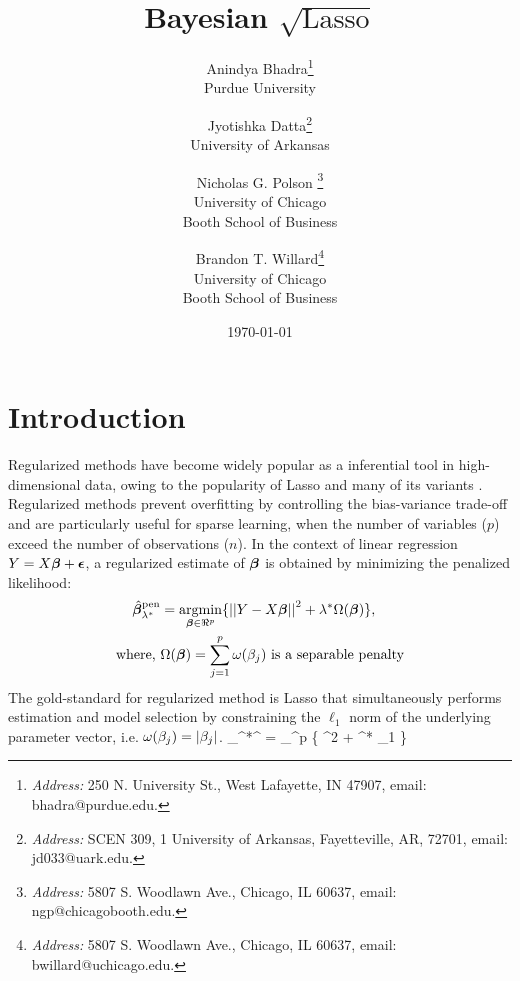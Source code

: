 \documentclass[12pt]{article}
\title{Bayesian $\sqrt{\text{Lasso}}$}
\author{
  Anindya Bhadra\footnote{
  {\em Address:} 250 N. University St., West Lafayette, IN 47907, 
  email: bhadra@purdue.edu.} \\
  Purdue University
  \and Jyotishka Datta\footnote{
  {\em Address:} SCEN 309, 1 University of Arkansas, Fayetteville, AR, 72701, 
  email: jd033@uark.edu.}\\ 
  University of Arkansas \\
  \and Nicholas G. Polson \footnote{
  {\em Address:} 5807 S. Woodlawn Ave., Chicago, IL 60637, 
  email: ngp@chicagobooth.edu.}  \\
  University of Chicago  \\
  Booth School of Business
  \and 
  Brandon T. Willard\footnote{
  {\em Address:} 5807 S. Woodlawn Ave., Chicago, IL 60637, 
  email: bwillard@uchicago.edu.} \\
  University of Chicago  \\
  Booth School of Business
}
\date{\today}
\begin{document}
\maketitle
\onehalfspacing



\section{Introduction}

Regularized methods have become widely popular as a inferential tool in high-dimensional data, owing to the popularity of Lasso \citep{tibshirani96} and many of its variants \citep{tibshirani2014praise}. Regularized methods prevent overfitting by controlling the bias-variance trade-off and are particularly useful for sparse learning, when the number of variables ($p$) exceed the number of observations ($n$). In the context of linear regression $Y = X \boldsymbol{\beta} + \boldsymbol{\epsilon}$, a regularized estimate of $\boldsymbol{\beta}$ is obtained by minimizing the penalized likelihood:
\begin{align}
\hat{\bbeta}_{\lambda^*}^{\text{pen}} & = \argmin_{\bbeta \in \Re^p} \{ \vectornorm{Y - X\bbeta}^2 + \lambda^* \Omega(\bbeta) \}, \label{eq:penalize} \\
  \text{where, } & \Omega(\bbeta) = \sum_{j=1}^{p} \omega(\beta_j) \text{ is a separable penalty}
\end{align}
The gold-standard for regularized method is Lasso that simultaneously performs estimation and model selection by constraining the $\ell_1$ norm of the underlying parameter vector, i.e. $\omega(\beta_j) = \lvert\beta_j\rvert$. 
\beq
\hat{\bbeta}_{\lambda^*}^{} = \argmin_{\bbeta \in \Re^p} \{ ^2 + \lambda^* \norm{\bbeta}_1 \} \label{eq:lasso}
\eeq
\end{document}
